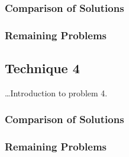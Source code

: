       \subsubsection{Comparison of Solutions}
      \subsubsection{Remaining Problems}

    \subsection{Technique 4}
      \ldots Introduction to problem 4.

      \subsubsection{Comparison of Solutions}
      \subsubsection{Remaining Problems}
      